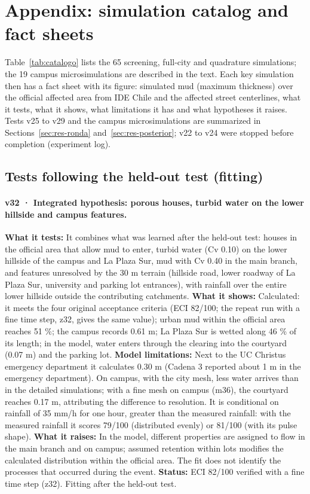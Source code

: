 \section{Appendix: simulation catalog and fact sheets}\label{sec:anexo}

Table~\ref{tab:catalogo} lists the 65 screening, full-city and quadrature simulations; the 19 campus microsimulations are described in the text. Each key simulation then has a fact sheet with its figure: simulated mud (maximum thickness) over the official affected area from IDE Chile and the affected street centerlines, what it tests, what it shows, what limitations it has and what hypotheses it raises. Tests v25 to v29 and the campus microsimulations are summarized in Sections~\ref{sec:res-ronda} and~\ref{sec:res-posterior}; v22 to v24 were stopped before completion (experiment log).



\subsection*{Tests following the held-out test (fitting)}

\paragraph{v32 · Integrated hypothesis: porous houses, turbid water on the lower hillside and campus features.} \textbf{What it tests:} It combines what was learned after the held-out test: houses in the official area that allow mud to enter, turbid water (Cv 0.10) on the lower hillside of the campus and La Plaza Sur, mud with Cv 0.40 in the main branch, and features unresolved by the 30 m terrain (hillside road, lower roadway of La Plaza Sur, university and parking lot entrances), with rainfall over the entire lower hillside outside the contributing catchments. \textbf{What it shows:} Calculated: it meets the four original acceptance criteria (ECI 82/100; the repeat run with a fine time step, z32, gives the same value); urban mud within the official area reaches 51 \%; the campus records 0.61 m; La Plaza Sur is wetted along 46 \% of its length; in the model, water enters through the clearing into the courtyard (0.07 m) and the parking lot. \textbf{Model limitations:} Next to the UC Christus emergency department it calculates 0.30 m (Cadena 3 reported about 1 m in the emergency department). On campus, with the city mesh, less water arrives than in the detailed simulations; with a fine mesh on campus (m36), the courtyard reaches 0.17 m, attributing the difference to resolution. It is conditional on rainfall of 35 mm/h for one hour, greater than the measured rainfall: with the measured rainfall it scores 79/100 (distributed evenly) or 81/100 (with its pulse shape). \textbf{What it raises:} In the model, different properties are assigned to flow in the main branch and on campus; assumed retention within lots modifies the calculated distribution within the official area. The fit does not identify the processes that occurred during the event. \textbf{Status:} ECI 82/100 verified with a fine time step (z32). Fitting after the held-out test.


